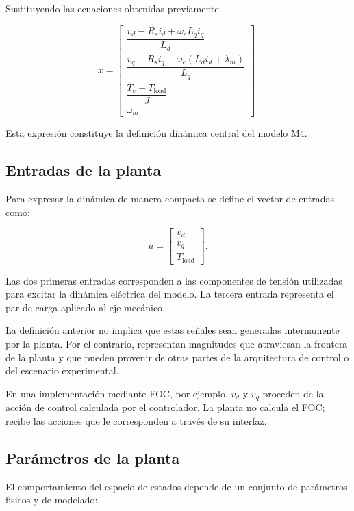 Sustituyendo las ecuaciones obtenidas previamente:

\begin{equation}
\dot{x}
=
\begin{bmatrix}
\dfrac{v_d-R_si_d+\omega_eL_qi_q}{L_d}
\\[6pt]
\dfrac{v_q-R_si_q-\omega_e(L_di_d+\lambda_m)}{L_q}
\\[6pt]
\dfrac{T_e-T_{\mathrm{load}}}{J}
\\[6pt]
\omega_m
\end{bmatrix}.
\end{equation}

Esta expresión constituye la definición dinámica central del modelo M4.

\subsection{Entradas de la planta}

Para expresar la dinámica de manera compacta se define el vector de entradas como:

\begin{equation}
u =
\begin{bmatrix}
v_d\\
v_q\\
T_{\mathrm{load}}
\end{bmatrix}.
\end{equation}

Las dos primeras entradas corresponden a las componentes de tensión utilizadas para excitar la dinámica eléctrica del modelo. La tercera entrada representa el par de carga aplicado al eje mecánico.

La definición anterior no implica que estas señales sean generadas internamente por la planta. Por el contrario, representan magnitudes que atraviesan la frontera de la planta y que pueden provenir de otras partes de la arquitectura de control o del escenario experimental.

En una implementación mediante FOC, por ejemplo, $v_d$ y $v_q$ proceden de la acción de control calculada por el controlador. La planta no calcula el FOC; recibe las acciones que le corresponden a través de su interfaz.

\subsection{Parámetros de la planta}

El comportamiento del espacio de estados depende de un conjunto de parámetros físicos y de modelado:


